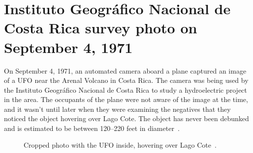 \section{Instituto Geogr\'afico Nacional de Costa Rica survey photo on September 4, 1971}
\label{2023-UFO-part-History-photos-1971-cr}

On September 4, 1971, an automated camera aboard a plane captured an image of a UFO near the Arenal Volcano in Costa Rica.
The camera was being used by the Instituto Geogr\'afico Nacional de Costa Rica to study a hydroelectric project in the area.
The occupants of the plane were not aware of the image at the time, and it wasn't until later when they were
examining the negatives that they noticed the object hovering over  Lago Cote.
The object has never been debunked and is estimated to be between 120--220 feet in diameter~\cite{Adams2022May}.

%
\begin{figure}[b]
\sidecaption
%
%
\caption{Cropped photo with the UFO inside, hovering over  Lago Cote~\cite{Adams2022May}.}

\label{2023-UFO-part-History-photos-1971-cr-cr-c}       %
\end{figure}

